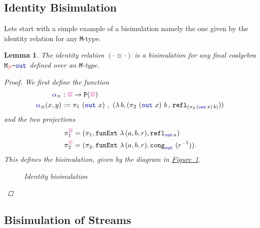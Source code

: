 \documentclass[twoside,11pt,openright]{report}
\theoremstyle{plain} %
\newtheorem{lem}[thm]{Lemma}
\theoremstyle{definition}
\theoremstyle{remark}
\newcommand*{\figref}[1]{\hyperref[fig:#1]{Figure~\ref*{fig:#1}}}
\newcommand*{\type}[1]{\textcolor{magenta!90!black}{#1}}
\newcommand*{\container}[1]{\textcolor{red}{#1}}
\newcommand*{\coalg}[2]{#1\texttt{-}#2}
\newcommand*{\function}[1]{\textcolor{blue!60!black}{\ensuremath{\mathtt{#1}}}}
\newcommand*{\typeformer}[1]{\ensuremath{\mathtt{#1}}}
\newcommand*{\functor}[1]{\ensuremath{\mathbf{\mathtt{#1}}}}
\newcommand*{\sym}[1]{\ensuremath{#1^{-1}}}
\begin{document}
\subsection{Identity Bisimulation}
Lets start with a simple example of a bisimulation namely the one given by the identity relation for any \texttt{M}-type.
\begin{lem}
  The identity relation \((\cdot \equiv \cdot)\) is a bisimulation for any final coalgebra \(\coalg{\typeformer{M}_{\container{S}}}{\function{out}}\) defined over an \texttt{M}-type.
  
  \begin{proof}
  We first define the function
  \begin{equation}
    \begin{aligned}
      \function{\alpha}_{\equiv} &: \type{\overline{\equiv}} \rightarrow \functor{P}(\type{\overline{\equiv}}) \\
      \function{\alpha}_{\equiv} (x , y) &:= \pi_1~(\function{out}~x)~,~(\lambda\,b, (\pi_2~(\function{out}~x)~b \,,\, \texttt{refl}_{(\pi_2\,(\function{out}\,x)\,b)}))
    \end{aligned}
  \end{equation}
  and the two projections
  \begin{align}
    \pi_1^{\type{\overline{\equiv}}} &= (\pi_1 , \texttt{funExt}~\lambda\,(a,b,r), \texttt{refl}_{\function{out}\,a}) \\
    \pi_2^{\type{\overline{\equiv}}} &= (\pi_2 , \texttt{funExt}~\lambda\,(a,b,r), \texttt{cong}_{\function{out}}~(\sym{r})).
  \end{align}
  This defines the bisimulation, given by the diagram in \figref{id-bisim}.
  \begin{figure}[h]
    \centering
    \caption{Identity bisimulation}
    \label{fig:id-bisim}
  \end{figure}
\end{proof}
\end{lem}
\subsection{Bisimulation of Streams}
\end{document}
